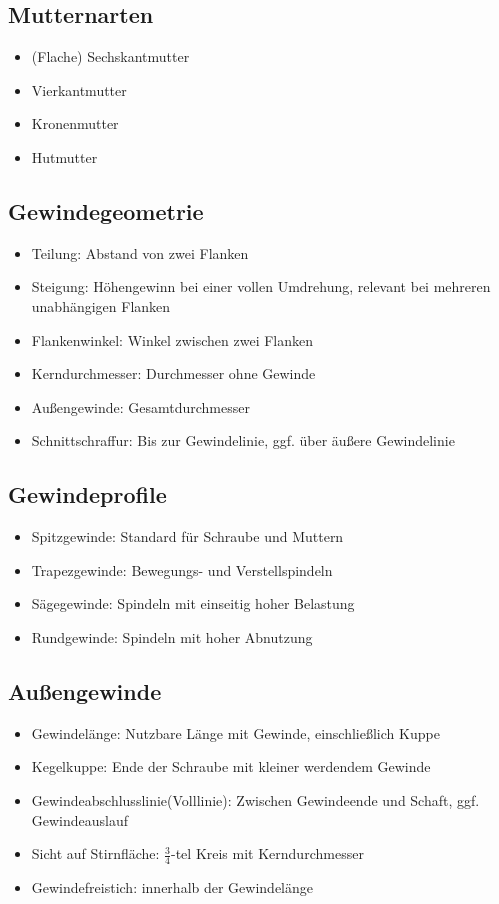 \documentclass[a4paper,parskip=half*,DIV=7,fontsize=11pt]{scrartcl}
\begin{document}
\subsection{Mutternarten}
\begin{itemize}
	\item (Flache) Sechskantmutter
	\item Vierkantmutter
	\item Kronenmutter
	\item Hutmutter
\end{itemize}
	
\subsection{Gewindegeometrie}
\begin{itemize}
	\item Teilung: Abstand von zwei Flanken
	\item Steigung: Höhengewinn bei einer vollen Umdrehung, relevant bei mehreren unabhängigen Flanken
	\item Flankenwinkel: Winkel zwischen zwei Flanken
	\item Kerndurchmesser: Durchmesser ohne Gewinde
	\item Außengewinde: Gesamtdurchmesser
	\item Schnittschraffur: Bis zur Gewindelinie, ggf. über äußere Gewindelinie
\end{itemize}
	
\subsection{Gewindeprofile}
\begin{itemize}
	\item Spitzgewinde: Standard für Schraube und Muttern
	\item Trapezgewinde: Bewegungs- und Verstellspindeln
	\item Sägegewinde: Spindeln mit einseitig hoher Belastung
	\item Rundgewinde: Spindeln mit hoher Abnutzung
\end{itemize}
	
\subsection{Außengewinde}
\begin{itemize}
	\item Gewindelänge: Nutzbare Länge mit Gewinde, einschließlich Kuppe
	\item Kegelkuppe: Ende der Schraube mit kleiner werdendem Gewinde
	\item Gewindeabschlusslinie(Volllinie): Zwischen Gewindeende und Schaft, ggf. Gewindeauslauf
	\item Sicht auf Stirnfläche: $\frac{3}{4}$-tel Kreis mit Kerndurchmesser
	\item Gewindefreistich: innerhalb der Gewindelänge
\end{itemize}
	
\end{document}
